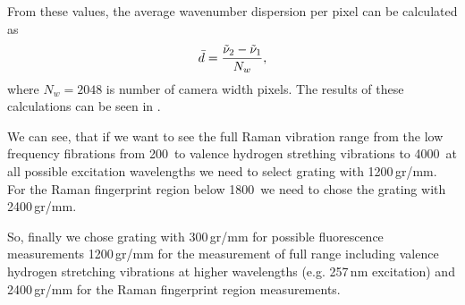 From these values, the average wavenumber dispersion per pixel can be
calculated as
\begin{equation}
	\bar{d} = \frac{\tilde{\nu}_2 - \tilde{\nu}_1}{N_w},
	\label{\eqnlabel{spectrograph_selection:dispersion_est}}
\end{equation}
where $N_w = 2048$ is number of camera width pixels. The results of these
calculations can be seen in
.

\begin{table}
	\centering
	
	\caption{Spectrograph dispersion estimation. Gratings are denoted by number
		of grooves per mm, $\tilde{\nu}_1$ and $\tilde{\nu}_2$ are lowest and
		highest detected frequencies in \icm calculated according to
		\cref{%
			\eqnlabel{spectrograph_selection:spectral_range_max_est},%
			\eqnlabel{spectrograph_selection:spectral_range_min_est}%
		},
		respectively. The $\bar{d}$ denotes average dispersion in \icm/px
		calculated from
		.}
	\label{\tablabel{spectrograph_selection:dispersion_est}}
\end{table}

We can see, that if we want to see the full Raman vibration range from the
low frequency fibrations from 200\,\icm{} to valence hydrogen strething
vibrations to 4000\,\icm{} at all possible excitation wavelengths we need to
select grating with 1200\,gr/mm. For the Raman fingerprint region below
1800\,\icm{} we need to chose the grating with 2400\,gr/mm.

So, finally we chose grating with 300\,gr/mm for possible fluorescence
measurements 1200\,gr/mm for the measurement of full range including valence
hydrogen stretching vibrations at higher wavelengths (e.g. 257\,nm excitation)
and 2400\,gr/mm for the Raman fingerprint region measurements.

